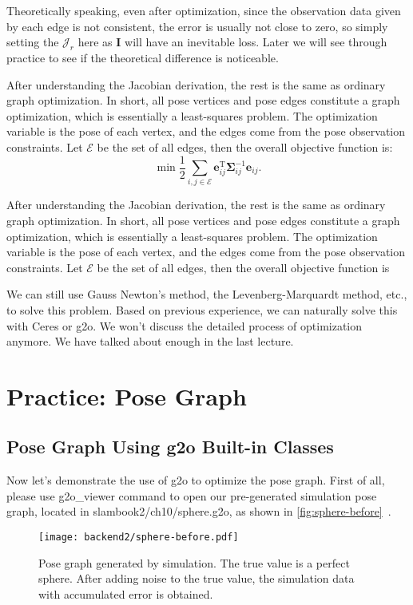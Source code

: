 Theoretically speaking, even after optimization, since the observation data given by each edge is not consistent, the error is usually not close to zero, so simply setting the $\bm{\mathcal{J}}_r$ here as $\bm{I}$ will have an inevitable loss. Later we will see through practice to see if the theoretical difference is noticeable.

After understanding the Jacobian derivation, the rest is the same as ordinary graph optimization. In short, all pose vertices and pose edges constitute a graph optimization, which is essentially a least-squares problem. The optimization variable is the pose of each vertex, and the edges come from the pose observation constraints. Let $\mathcal{E}$ be the set of all edges, then the overall objective function is:
\begin{equation}
	\mathop {\min }\limits \frac{1}{2}\sum\limits_{i,j \in \mathcal{E}} \bm{e}_{ij}^\mathrm{T} \bm{\Sigma}_{ij}^{-1} \bm{e}_{ij}.
\end{equation}

After understanding the Jacobian derivation, the rest is the same as ordinary graph optimization. In short, all pose vertices and pose edges constitute a graph optimization, which is essentially a least-squares problem. The optimization variable is the pose of each vertex, and the edges come from the pose observation constraints. Let $\mathcal{E}$ be the set of all edges, then the overall objective function is

We can still use Gauss Newton's method, the Levenberg-Marquardt method, etc., to solve this problem.  Based on previous experience, we can naturally solve this with Ceres or g2o. We won't discuss the detailed process of optimization anymore. We have talked about enough in the last lecture.

\section{Practice: Pose Graph}
\subsection{Pose Graph Using g2o Built-in Classes}
Now let's demonstrate the use of g2o to optimize the pose graph. First of all, please use g2o\_viewer command to open our pre-generated simulation pose graph, located in slambook2/ch10/sphere.g2o, as shown in \autoref{fig:sphere-before}~.

\begin{figure}[!htp]
	\centering
	\texttt{[image: backend2/sphere-before.pdf]}
	\caption{Pose graph generated by simulation. The true value is a perfect sphere. After adding noise to the true value, the simulation data with accumulated error is obtained.}
	\label{fig:sphere-before}
\end{figure}

